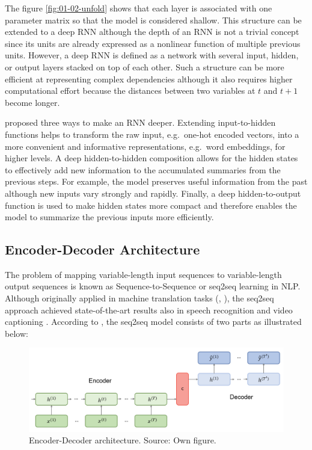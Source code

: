 \documentclass[]{krantz}
\begin{document}
The figure \ref{fig:01-02-unfold} shows that each layer is associated with one parameter matrix so that the model is considered shallow. This structure can be extended to a deep RNN although the depth of an RNN is not a trivial concept since its units are already expressed as a nonlinear function of multiple previous units. However, a deep RNN is defined as a network with several input, hidden, or output layers stacked on top of each other. Such a structure can be more efficient at representing complex dependencies although it also requires higher computational effort because the distances between two variables at \(t\) and \(t+1\) become longer. \citep{pascanu2013construct}

\citet{pascanu2013construct} proposed three ways to make an RNN deeper. Extending input-to-hidden functions helps to transform the raw input, e.g.~one-hot encoded vectors, into a more convenient and informative representations, e.g.~word embeddings, for higher levels. A deep hidden-to-hidden composition allows for the hidden states to effectively add new information to the accumulated summaries from the previous steps. For example, the model preserves useful information from the past although new inputs vary strongly and rapidly. Finally, a deep hidden-to-output function is used to make hidden states more compact and therefore enables the model to summarize the previous inputs more efficiently.

\hypertarget{encoder-decoder-architecture}{%
\subsection{Encoder-Decoder Architecture}\label{encoder-decoder-architecture}}

The problem of mapping variable-length input sequences to variable-length output sequences is known as Sequence-to-Sequence or seq2seq learning in NLP. Although originally applied in machine translation tasks (\citet{sutskever2014sequence}, \citet{cho2014learning}), the seq2seq approach achieved state-of-the-art results also in speech recognition \citep{prabhavalkar2017comparison} and video captioning \citep{venugopalan2015sequence}. According to \citet{cho2014learning}, the seq2seq model consists of two parts as illustrated below:

\begin{figure}

{\centering \includegraphics[width=1\linewidth]{figures/01-02-rnns-and-their-applications-in-nlp/04_encoder_decoder} 

}

\caption{Encoder-Decoder architecture. Source: Own figure.}\label{fig:01-02-enc-dec}
\end{figure}
\end{document}
